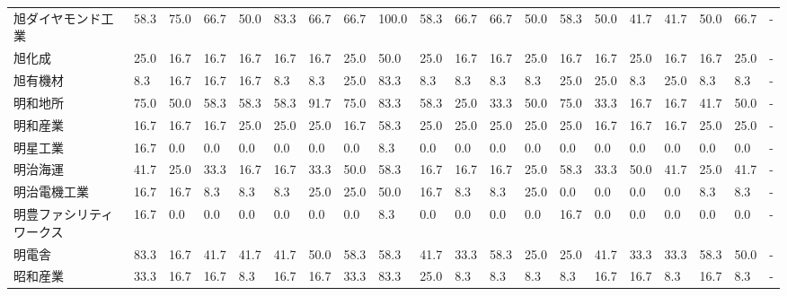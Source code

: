 \documentclass[a4paper，11pt]{jsarticle}
\begin{document}
\begin{longtable}[c]{lp{3mm}p{3mm}p{3mm}p{3mm}p{3mm}p{3mm}p{3mm}p{3mm}p{3mm}p{3mm}p{3mm}p{3mm}p{3mm}p{3mm}p{3mm}p{3mm}p{3mm}p{3mm}p{3mm}}
旭ダイヤモンド工業       &   58.3 &   75.0 &      66.7 &      50.0 &       83.3 &   66.7 &   66.7 &  100.0 &    58.3 &    66.7 &   66.7 &  50.0 &   58.3 &    50.0 &    41.7 &  41.7 &  50.0 &  66.7 &     - \\
旭化成             &   25.0 &   16.7 &      16.7 &      16.7 &       16.7 &   16.7 &   25.0 &   50.0 &    25.0 &    16.7 &   16.7 &  25.0 &   16.7 &    16.7 &    25.0 &  16.7 &  16.7 &  25.0 &     - \\
旭有機材            &    8.3 &   16.7 &      16.7 &      16.7 &        8.3 &    8.3 &   25.0 &   83.3 &     8.3 &     8.3 &    8.3 &   8.3 &   25.0 &    25.0 &     8.3 &  25.0 &   8.3 &   8.3 &     - \\
明和地所            &   75.0 &   50.0 &      58.3 &      58.3 &       58.3 &   91.7 &   75.0 &   83.3 &    58.3 &    25.0 &   33.3 &  50.0 &   75.0 &    33.3 &    16.7 &  16.7 &  41.7 &  50.0 &     - \\
明和産業            &   16.7 &   16.7 &      16.7 &      25.0 &       25.0 &   25.0 &   16.7 &   58.3 &    25.0 &    25.0 &   25.0 &  25.0 &   25.0 &    16.7 &    16.7 &  16.7 &  25.0 &  25.0 &     - \\
明星工業            &   16.7 &    0.0 &       0.0 &       0.0 &        0.0 &    0.0 &    0.0 &    8.3 &     0.0 &     0.0 &    0.0 &   0.0 &    0.0 &     0.0 &     0.0 &   0.0 &   0.0 &   0.0 &     - \\
明治海運            &   41.7 &   25.0 &      33.3 &      16.7 &       16.7 &   33.3 &   50.0 &   58.3 &    16.7 &    16.7 &   16.7 &  25.0 &   58.3 &    33.3 &    50.0 &  41.7 &  25.0 &  41.7 &     - \\
明治電機工業          &   16.7 &   16.7 &       8.3 &       8.3 &        8.3 &   25.0 &   25.0 &   50.0 &    16.7 &     8.3 &    8.3 &  25.0 &    0.0 &     0.0 &     0.0 &   0.0 &   8.3 &   8.3 &     - \\
明豊ファシリティワークス    &   16.7 &    0.0 &       0.0 &       0.0 &        0.0 &    0.0 &    0.0 &    8.3 &     0.0 &     0.0 &    0.0 &   0.0 &   16.7 &     0.0 &     0.0 &   0.0 &   0.0 &   0.0 &     - \\
明電舎             &   83.3 &   16.7 &      41.7 &      41.7 &       41.7 &   50.0 &   58.3 &   58.3 &    41.7 &    33.3 &   58.3 &  25.0 &   25.0 &    41.7 &    33.3 &  33.3 &  58.3 &  50.0 &     - \\
昭和産業            &   33.3 &   16.7 &      16.7 &       8.3 &       16.7 &   16.7 &   33.3 &   83.3 &    25.0 &     8.3 &    8.3 &   8.3 &    8.3 &    16.7 &    16.7 &   8.3 &  16.7 &   8.3 &     - \\

\end{longtable}
\end{document}
